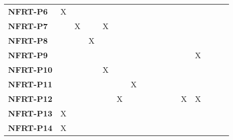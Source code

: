 \documentclass[12pt, titlepage]{article}
\begin{document}
\begin{landscape}
\begin{longtable}{|l|ccccccccccccc|}
		\textbf{NFRT-P6} & X                                                         & ~             & ~             & ~             & ~             & ~             & ~             & ~             & ~             & ~             & ~             & ~             & ~ \\
		\textbf{NFRT-P7} & ~                                                         & X             & ~             & X             & ~             & ~             & ~             & ~             & ~             & ~             & ~ & ~ & ~\\
		\textbf{NFRT-P8} & ~                                                         & ~             & X             & ~             & ~             & ~             & ~             & ~             & ~             & ~             & ~ & ~ & ~\\
		\textbf{NFRT-P9} & ~                                                         & ~             & ~             & ~             & ~             & ~             & ~             & ~             & ~             & ~             & X             & ~             & ~ \\
		\textbf{NFRT-P10} & ~                                                         & ~             & ~             & X             & ~             & ~             & ~             & ~             & ~             & ~             & ~             & ~             & ~ \\
		\textbf{NFRT-P11} & ~                                                         & ~             & ~             & ~             & ~             & X             & ~             & ~             & ~             & ~             & ~ & ~ & ~ \\
		\textbf{NFRT-P12} & ~                                                         & ~             & ~             & ~             & X             & ~             & ~             & ~             & ~             & X             & X & ~ & ~\\
		\textbf{NFRT-P13} & X                                                         & ~             & ~             & ~             & ~             & ~             & ~             & ~             & ~             & ~             & ~             & ~             & ~\\
		\textbf{NFRT-P14} & X                                                         & ~             & ~             & ~             & ~             & ~             & ~             & ~             & ~             & ~             & ~             & ~             & ~\\

\end{longtable}
\end{landscape}
\end{document}
